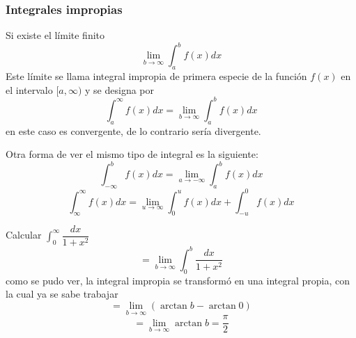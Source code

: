 \documentclass[10pt,twoside]{SelfArx} %
\begin{document}
 \subsubsection{Integrales impropias}
 
 \begin{thm}
 	Si existe el límite finito
 	\begin{equation}
 	\lim\limits_{b\rightarrow\infty}\int_{a}^{b}f(x)dx
 	\end{equation}
 	Este límite se llama integral impropia de primera especie de la función $ f(x) $ en el intervalo $ [a,\infty) $ y se designa por 
 	\begin{equation}
 	\int_{a}^{\infty}f(x)dx=\lim\limits_{b\rightarrow\infty}\int_{a}^{b}f(x)dx
 	\end{equation}
 	en este caso es convergente, de lo contrario sería divergente.
 \end{thm}
 Otra forma de ver el mismo tipo de integral es la siguiente:
 \begin{equation}
 \int_{-\infty}^{b}f(x)dx=\lim\limits_{a\rightarrow-\infty}\int_{a}^{b}f(x)dx
 \end{equation}
 \begin{equation}
\int_{\infty}^{\infty}f(x)dx=\lim\limits_{u\rightarrow\infty}\int_{0}^{u}f(x)dx+\int_{-u}^{0}f(x)dx
 \end{equation}
\begin{ejemplo}
Calcular $ 	\displaystyle\int_{0}^{\infty}\dfrac{dx}{1+x^{2}} $
\begin{equation}
=	\lim\limits_{b\rightarrow\infty}\int_{0}^{b}\dfrac{dx}{1+x^{2}} 
\end{equation}
como se pudo ver, la integral impropia se transformó en una integral propia, con la cual ya se sabe trabajar
\begin{equation}
=	\lim\limits_{b\rightarrow\infty}(\arctan b- \arctan 0)
\end{equation}
\begin{equation}
=	\lim\limits_{b\rightarrow\infty}\arctan b=\dfrac{\pi}{2}
\end{equation}
\end{ejemplo}
\end{document}
